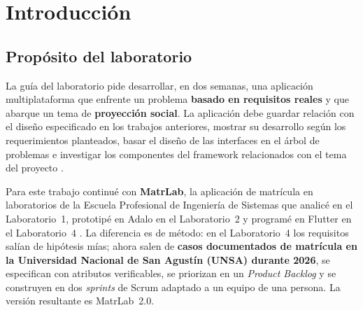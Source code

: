 \section{Introducción}
\label{sec:intro}

\subsection{Propósito del laboratorio}
La guía del laboratorio pide desarrollar, en dos semanas, una aplicación multiplataforma que enfrente un problema \textbf{basado en requisitos reales} y que abarque un tema de \textbf{proyección social}. La aplicación debe guardar relación con el diseño especificado en los trabajos anteriores, mostrar su desarrollo según los requerimientos planteados, basar el diseño de las interfaces en el árbol de problemas e investigar los componentes del framework relacionados con el tema del proyecto \cite{guia05}.

Para este trabajo continué con \textbf{MatrLab}, la aplicación de matrícula en laboratorios de la Escuela Profesional de Ingeniería de Sistemas que analicé en el Laboratorio~1, prototipé en Adalo en el Laboratorio~2 y programé en Flutter en el Laboratorio~4 \cite{lab1,lab2,lab4}. La diferencia es de método: en el Laboratorio~4 los requisitos salían de hipótesis mías; ahora salen de \textbf{casos documentados de matrícula en la Universidad Nacional de San Agustín (UNSA) durante 2026}, se especifican con atributos verificables, se priorizan en un \emph{Product Backlog} y se construyen en dos \emph{sprints} de Scrum adaptado a un equipo de una persona. La versión resultante es MatrLab~2.0.

